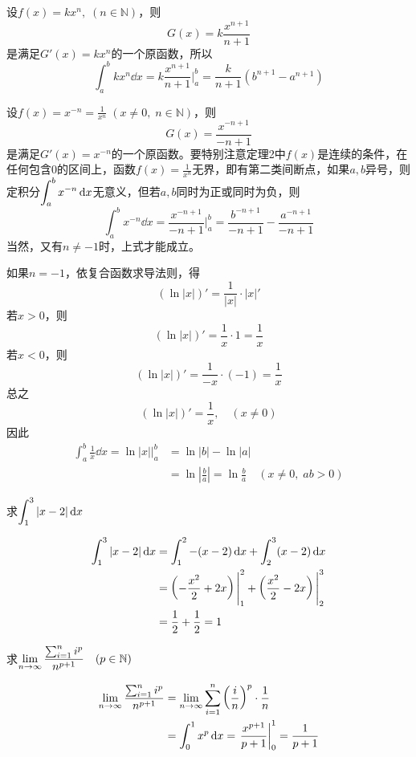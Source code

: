 \begin{example}
    设$f(x)=kx^n,\; (n\in\mathbb{N})$，则
\[G(x)=k\frac{x^{n+1}}{n+1}\]
是满足$G'(x)=kx^n$的一个原函数，所以
\[\int^b_akx^n\dd x=k\frac{x^{n+1}}{n+1}\Bigg|^b_a=\frac{k}{n+1}(b^{n+1}-a^{n+1})\]
\end{example}

\begin{example}
设$f(x)=x^{-n}=\frac{1}{x^n}\; (x\ne 0,\; n\in\mathbb{N})$，则
\[G(x)=\frac{x^{-n+1}}{-n+1}\]
是满足$G'(x)=x^{-n}$的一个原函数。要特别注意定理2中$f(x)$是连续的条件，在任何包含0的区间上，函数$f(x)=\frac{1}{x^n}$无界，即有第二类间断点，如果$a,b$异号，则定积分$\displaystyle\int^b_a x^{-n}\,{\rm d} x$无意义，但若$a,b$同时为正或同时为负，则
\[\int^b_ax^{-n}\dd x=\frac{x^{-n+1}}{-n+1}\Bigg|^b_a=\frac{b^{-n+1}}{-n+1}-\frac{a^{-n+1}}{-n+1}\]
当然，又有$n\ne -1$时，上式才能成立。

如果$n=-1$，依复合函数求导法则，得
\[(\ln|x|)'=\frac{1}{|x|}\cdot |x|'\]
若$x>0$，则
\[(\ln|x|)'=\frac{1}{x}\cdot 1=\frac{1}{x}\]
若$x<0$，则
\[(\ln|x|)'=\frac{1}{-x}\cdot (-1)=\frac{1}{x}\]
总之
\[(\ln|x|)'=\frac{1}{x},\quad (x\ne 0)\]
因此
\[\begin{split}
\int^b_a \frac{1}{x}\dd x=\ln |x|\Bigg|^b_a &=\ln|b|-\ln |a|\\
&=\ln\left|\frac{b}{a}\right|=\ln\frac{b}{a}\quad (x\ne 0,\; ab>0)
\end{split}\]
\end{example}

\begin{example}
    求$\displaystyle\int^3_1 |x-2|\,{\rm d} x$
\end{example}

\begin{solution}
\[\begin{split}
    \displaystyle\int^3_1 |x-2|\,{\rm d} x&=\displaystyle\int^2_1 -(x-2)\,{\rm d} x+\displaystyle\int^3_2 (x-2)\,{\rm d} x\\
&=\left(-\dfrac{x^2}{2}+2x\right)\Bigg|^2_1+\left(\dfrac{x^2}{2}-2x\right)\Bigg|^3_2\\
&=\dfrac{1}{2}+\dfrac{1}{2}=1
\end{split}\]
\end{solution}

\begin{example}
求$\displaystyle\lim_{n\to\infty}\dfrac{\sum^n_{i=1}i^p}{n^{p+1}}\quad (p\in \mathbb{N})$
\end{example}


\begin{solution}
\[\begin{split}
    \displaystyle\lim_{n\to\infty}\dfrac{\sum^n_{i=1}i^p}{n^{p+1}}&=\displaystyle\lim_{n\to\infty}\sum^n_{i=1}\left(\dfrac{i}{n}\right)^p\cdot \dfrac{1}{n}\\
    &=\int^1_0 x^p\,{\rm d} x=\left.\dfrac{x^{p+1}}{p+1}\right|^1_0=\dfrac{1}{p+1}
\end{split}\]
\end{solution}

